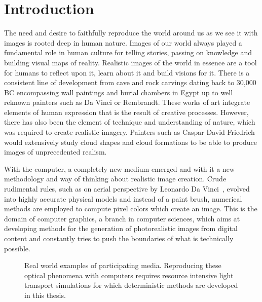 \chapter{Introduction}
\label{sec:introduction}



The need and desire to faithfully reproduce the world around us as we see it with images is rooted deep in human nature. Images of our world always played a fundamental role in human culture for telling stories, passing on knowledge and building visual maps of reality. Realistic images of the world in essence are a tool for humans to reflect upon it, learn about it and build visions for it. There is a consistent line of development from cave and rock carvings dating back to 30,000 BC encompassing wall paintings and burial chambers in Egypt up to well reknown painters such as Da Vinci or Rembrandt. These works of art integrate elements of human expression that is the result of creative processes. However, there has also been the element of technique and understanding of nature, which was required to create realistic imagery. Painters such as Caspar David Friedrich would extensively study cloud shapes and cloud formations to be able to produce images of unprecedented realism.

With the computer, a completely new medium emerged and with it a new methodology and way of thinking about realistic image creation. Crude rudimental rules, such as on aerial perspective by Leonardo Da Vinci~\cite{DaVinci1651}, evolved into highly accurate physical models and instead of a paint brush, numerical methods are employed to compute pixel colors which create an image. This is the domain of computer graphics, a branch in computer sciences, which aims at developing methods for the generation of photorealistic images from digital content and constantly tries to push the boundaries of what is technically possible.
\begin{figure}[ht]
\centering
{}
\caption{Real world examples of participating media. Reproducing these optical phenomena with computers requires resource intensive light transport simulations for which deterministic methods are developed in this thesis.}
\label{fig:intro_participating_media_examples}
\end{figure}

